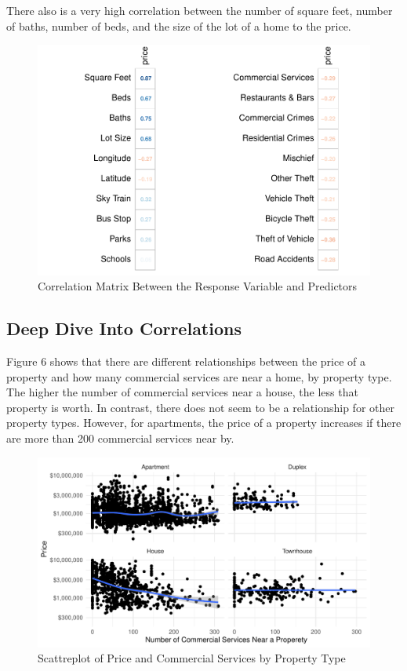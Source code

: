 \documentclass[
]{article}
\begin{document}
There also is a very high correlation between the number of square feet,
number of baths, number of beds, and the size of the lot of a home to
the price.

\begin{figure}
\centering
\includegraphics{final_report_files/figure-latex/unnamed-chunk-8-1.pdf}
\caption{Correlation Matrix Between the Response Variable and
Predictors}
\end{figure}

\hypertarget{deep-dive-into-correlations}{%
\subsection{Deep Dive Into
Correlations}\label{deep-dive-into-correlations}}

Figure 6 shows that there are different relationships between the price
of a property and how many commercial services are near a home, by
property type. The higher the number of commercial services near a
house, the less that property is worth. In contrast, there does not seem
to be a relationship for other property types. However, for apartments,
the price of a property increases if there are more than 200 commercial
services near by.

\begin{figure}
\centering
\includegraphics{final_report_files/figure-latex/unnamed-chunk-9-1.pdf}
\caption{Scattreplot of Price and Commercial Services by Property Type}
\end{figure}
\end{document}
